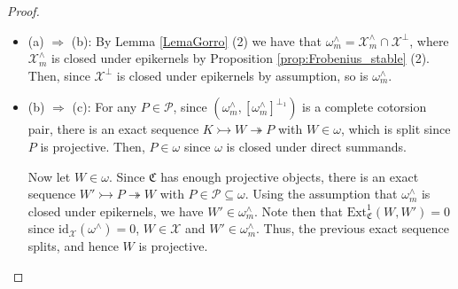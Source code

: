 \documentclass[10pt,reqno]{amsart}
\numberwithin{equation}{section}
\theoremstyle{remark}
\newcommand{\Ext}{\mathrm{Ext}}
\newcommand{\C}{\mathfrak{C}}
\newcommand{\X}{\mathcal{X}}
\newcommand{\id}{\mathrm{id}}
\begin{document}
\begin{proof} ~\
\begin{itemize}
\item (a) $\Rightarrow$ (b): By Lemma \ref{LemaGorro} (2) we have that $\omega^\wedge_m = \mathcal{X}^\wedge_m \cap \mathcal{X}^\perp$, where $\mathcal{X}^\wedge_m$ is closed under epikernels by Proposition \ref{prop:Frobenius_stable} (2). Then, since $\mathcal{X}^\perp$ is closed under epikernels by assumption, so is $\omega^\wedge_m$. 

\item (b) $\Rightarrow$ (c): For any $P \in \mathcal{P}$, since $(\omega^\wedge_m, [\omega^\wedge_m]^{\perp_1})$ is a complete cotorsion pair, there is an exact sequence $K \rightarrowtail W \twoheadrightarrow P$ with $W \in \omega$, which is split since $P$ is projective. Then, $P \in \omega$ since $\omega$ is closed under direct summands. 

Now let $W \in \omega$. Since $\C$ has enough projective objects, there is an exact sequence $W' \rightarrowtail P \twoheadrightarrow W$ with $P \in \mathcal{P} \subseteq \omega$. Using the assumption that $\omega^\wedge_m$ is closed under epikernels, we have $W' \in \omega^\wedge_m$. Note then that $\Ext^1_{\C}(W,W') = 0$ since $\id_{\X}(\omega^\wedge) = 0$, $W \in \X$ and $W' \in \omega^\wedge_m$. Thus, the previous exact sequence splits, and hence $W$ is projective.  


\end{itemize}
\end{proof}
\end{document}
